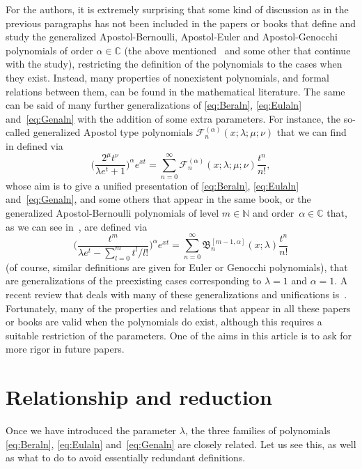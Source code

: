 \documentclass[11pt,a4paper]{amsart}
\newcommand{\N}{\mathbb{N}}
\newcommand{\C}{\mathbb{C}}
\theoremstyle{plain}
\theoremstyle{plain}
\theoremstyle{plain}
\begin{document}
For the authors, it is extremely surprising that some kind of discussion as in the previous paragraphs has not been included in the papers or books that define and study the generalized Apostol-Bernoulli, Apostol-Euler and Apostol-Genocchi polynomials of order $\alpha \in \C$ (the above mentioned~\cite{LuoSri-BeEu, LuoSri-Ge, SriCh} and some other that continue with the study), restricting the definition of the polynomials to the cases when they exist. Instead, many properties of nonexistent polynomials, and formal relations between them, can be found in the mathematical literature. The same can be said of many further generalizations of \eqref{eq:Beraln}, \eqref{eq:Eulaln} and~\eqref{eq:Genaln} with the addition of some extra parameters. For instance, the so-called generalized Apostol type polynomials $\mathcal{F}^{(\alpha)}_{n}(x;\lambda;\mu;\nu)$ that we can find in \cite[p.~101]{SriCh} defined via
\[
  \Big( \frac{2^\mu t^\nu}{\lambda e^t+1} \Big)^\alpha e^{xt} 
  = \sum_{n=0}^{\infty} \mathcal{F}^{(\alpha)}_{n}(x;\lambda;\mu;\nu) \frac{t^n}{n!},
\]
whose aim is to give a unified presentation of \eqref{eq:Beraln}, \eqref{eq:Eulaln} and~\eqref{eq:Genaln}, and some others that appear in the same book, or the generalized Apostol-Bernoulli polynomials of level $m \in \N$ and order~$\alpha \in \C$ that, as we can see in~\cite{Kurt}, are defined via
\[
  \Big( \frac{t^m}{\lambda e^t-\sum_{l=0}^m t^l/l!} \Big)^\alpha e^{xt} 
  = \sum_{n=0}^{\infty} \mathfrak{B}^{[m-1,\alpha]}_{n}(x;\lambda) \frac{t^n}{n!}
\] 
(of course, similar definitions are given for Euler or Genocchi polynomials), that are generalizations of the preexisting cases corresponding to $\lambda = 1$ and $\alpha = 1$. A recent review that deals with many of these generalizations and unifications is~\cite{Yam}. Fortunately, many of the properties and relations that appear in all these papers or books are valid when the polynomials do exist, although this requires a suitable restriction of the parameters. 
One of the aims in this article is to ask for more rigor in future papers. 

\section{Relationship and reduction}
\label{sec:reduction}

Once we have introduced the parameter $\lambda$, the three families of polynomials \eqref{eq:Beraln}, \eqref{eq:Eulaln} and~\eqref{eq:Genaln} are closely related. Let us see this, as well as what to do to avoid essentially redundant definitions.
\end{document}
